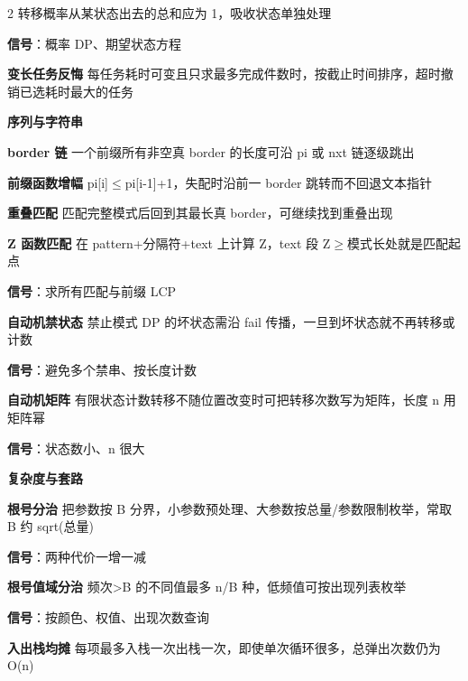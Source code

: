 \documentclass[UTF8,fontset=fandol,a4paper,twoside]{ctexart}
\newcommand{\topic}[1]{\par\smallskip\textbf{#1}\par\nobreak}
\begin{document}
\begin{multicols}{2}
转移概率从某状态出去的总和应为 1，吸收状态单独处理\par
\textbf{信号}：概率 DP、期望状态方程\par
\par\textbf{变长任务反悔}\quad
每任务耗时可变且只求最多完成件数时，按截止时间排序，超时撤销已选耗时最大的任务\par
\topic{序列与字符串}
\par\textbf{border 链}\quad
一个前缀所有非空真 border 的长度可沿 pi 或 nxt 链逐级跳出\par
\par\textbf{前缀函数增幅}\quad
pi[\allowbreak{}i]\allowbreak{}\ensuremath{\le}pi[\allowbreak{}i-\allowbreak{}1]\allowbreak{}+\allowbreak{}1，失配时沿前一 border 跳转而不回退文本指针\par
\par\textbf{重叠匹配}\quad
匹配完整模式后回到其最长真 border，可继续找到重叠出现\par
\par\textbf{Z 函数匹配}\quad
在 pattern+\allowbreak{}分隔符+\allowbreak{}text 上计算 Z，text 段 Z\ensuremath{\ge}模式长处就是匹配起点\par
\textbf{信号}：求所有匹配与前缀 LCP\par
\par\textbf{自动机禁状态}\quad
禁止模式 DP 的坏状态需沿 fail 传播，一旦到坏状态就不再转移或计数\par
\textbf{信号}：避免多个禁串、按长度计数\par
\par\textbf{自动机矩阵}\quad
有限状态计数转移不随位置改变时可把转移次数写为矩阵，长度 n 用矩阵幂\par
\textbf{信号}：状态数小、n 很大\par
\topic{复杂度与套路}
\par\textbf{根号分治}\quad
把参数按 B 分界，小参数预处理、大参数按总量/\allowbreak{}参数限制枚举，常取 B 约 sqrt(\allowbreak{}总量)\allowbreak{}\par
\textbf{信号}：两种代价一增一减\par
\par\textbf{根号值域分治}\quad
频次>\allowbreak{}B 的不同值最多 n/\allowbreak{}B 种，低频值可按出现列表枚举\par
\textbf{信号}：按颜色、权值、出现次数查询\par
\par\textbf{入出栈均摊}\quad
每项最多入栈一次出栈一次，即使单次循环很多，总弹出次数仍为 O(\allowbreak{}n)\allowbreak{}\par

\end{multicols}
\end{document}
